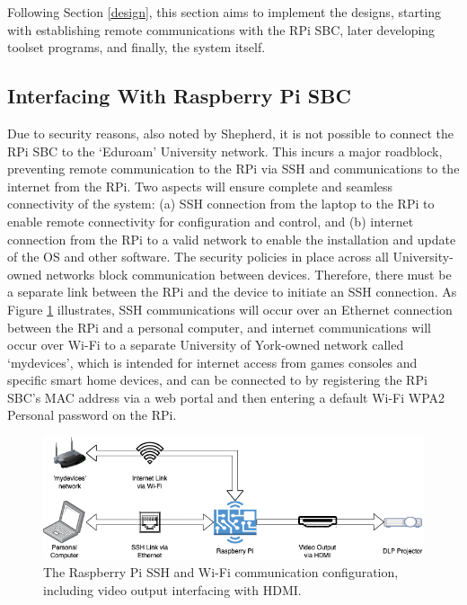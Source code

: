 Following Section \ref{design}, this section aims to implement the designs, starting with establishing remote communications with the RPi SBC, later developing toolset programs, and finally, the system itself.

\subsection{Interfacing With Raspberry Pi SBC}

Due to security reasons, also noted by Shepherd, it is not possible to connect the RPi SBC to the `Eduroam' University network. This incurs a major roadblock, preventing remote communication to the RPi via SSH and communications to the internet from the RPi. Two aspects will ensure complete and seamless connectivity of the system: (a) SSH connection from the laptop to the RPi to enable remote connectivity for configuration and control, and (b) internet connection from the RPi to a valid network to enable the installation and update of the OS and other software. The security policies in place across all University-owned networks block communication between devices. Therefore, there must be a separate link between the RPi and the device to initiate an SSH connection. As Figure \ref{fig:pi_interfacing} illustrates, SSH communications will occur over an Ethernet connection between the RPi and a personal computer, and internet communications will occur over Wi-Fi to a separate University of York-owned network called `mydevices', which is intended for internet access from games consoles and specific smart home devices, and can be connected to by registering the RPi SBC's MAC address via a web portal and then entering a default Wi-Fi WPA2 Personal password on the RPi.

\begin{figure}[H]
    \centering
    \includegraphics[width=1\textwidth]{assets/interface_diagram.png}
    \caption{The Raspberry Pi SSH and Wi-Fi communication configuration, including video output interfacing with HDMI.}
    \label{fig:pi_interfacing}
\end{figure}

